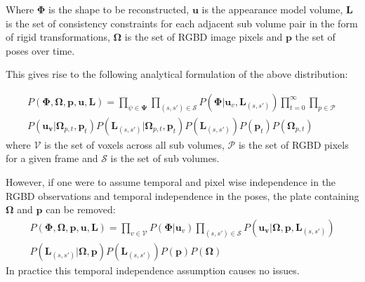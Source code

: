 Where $\mathbf{\Phi}$ is the shape to be reconstructed, $\mathbf{u}$ is the appearance model volume, $\mathbf{L}$ is the 
set of consistency constraints for each adjacent sub volume pair in the form of rigid transformations, $\mathbf{\Omega}$ is the set of 
RGBD image pixels and $\mathbf{p}$ the set of poses over time.

This gives rise to the following analytical formulation of the above distribution:

\begin{equation}
\begin{split}
P(\mathbf{\Phi}, \mathbf{\Omega}, \mathbf{p}, \mathbf{u}, \mathbf{L}) = 
\prod_{\psi \in \mathbf{\Psi}}\prod_{(s, s') \in \mathcal{S}}P(\mathbf{\Phi}|\mathbf{u}_{v}, \mathbf{L}_{(s, s')}) 
\prod_{t=0}^{\infty}\prod_{p \in \mathcal{P}}\\
P(\mathbf{u_{v}}|\mathbf{\Omega}_{p, t}, \mathbf{p}_{t})
P(\mathbf{L}_{(s, s')}|\mathbf{\Omega}_{p, t}, \mathbf{p}_{t})
P(\mathbf{L}_{(s, s')})P(\mathbf{p}_{t})P(\mathbf{\Omega}_{p, t})
\end{split}
\end{equation}
where $\mathcal{V}$ is the set of voxels across all sub volumes, $\mathcal{P}$ is the set of RGBD pixels for a given 
frame and $\mathcal{S}$ is the set of sub volumes.

However, if one were to assume temporal and pixel wise independence in the RGBD observations and temporal independence in 
the poses, the plate containing $\mathbf{\Omega}$ and $\mathbf{p}$ can be removed:
\begin{equation}
\begin{split}
P(\mathbf{\Phi}, \mathbf{\Omega}, \mathbf{p}, \mathbf{u}, \mathbf{L}) = 
\prod_{v \in \mathcal{V}}P(\mathbf{\Phi}|\mathbf{u}_{v})
\prod_{(s, s') \in \mathcal{S}}P(\mathbf{u_{v}}|\mathbf{\Omega}, \mathbf{p}, \mathbf{L}_{(s, s')})\\
P(\mathbf{L}_{(s, s')}|\mathbf{\Omega}, \mathbf{p}) P(\mathbf{L}_{(s, s')})P(\mathbf{p})P(\mathbf{\Omega})
\end{split}
\end{equation}
In practice this temporal independence assumption causes no issues.

